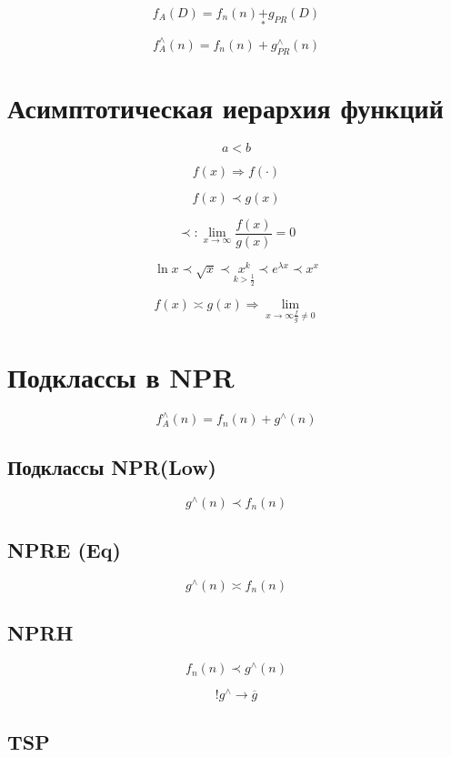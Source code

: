 \documentclass[a4paper, 14pt]{report}
\begin{document}
$$
f_A(D) = f_n(n) \underset{*}{+} g_{PR} (D)
$$

$$
f^\wedge_A(n) = f_n(n) + g^\wedge_{PR}(n)
$$


\section{Асимптотическая иерархия функций}

$$
a < b
$$

$$
f(x) \Rightarrow f(\cdot)
$$

$$
f(x) \prec g(x)
$$

$$
\prec : \lim_{x \to \infty} \frac{f(x)}{g(x)} = 0
$$

$$
\ln x \prec \sqrt{x} \prec \underset{k > \frac{1}{2}}{x^k} \prec e^{\lambda x}
\prec x^x
$$

$$
f(x) \asymp g(x) \Rightarrow \lim_{x \to \infty \frac{f}{g} \ne 0}
$$

\section{Подклассы в NPR}

$$
f_A^\wedge (n) = f_n(n) + g^\wedge (n)
$$

\subsection{Подклассы NPR(Low)}

$$
g^\wedge(n) \prec f_n(n)
$$

\subsection{NPRE (Eq)}

$$
g^\wedge (n) \asymp f_n(n)
$$

\subsection{NPRH}

$$
f_n(n) \prec g^\wedge (n)
$$

$$
!g^\wedge \to \overline{g}
$$

\subsection{TSP}
\end{document}
